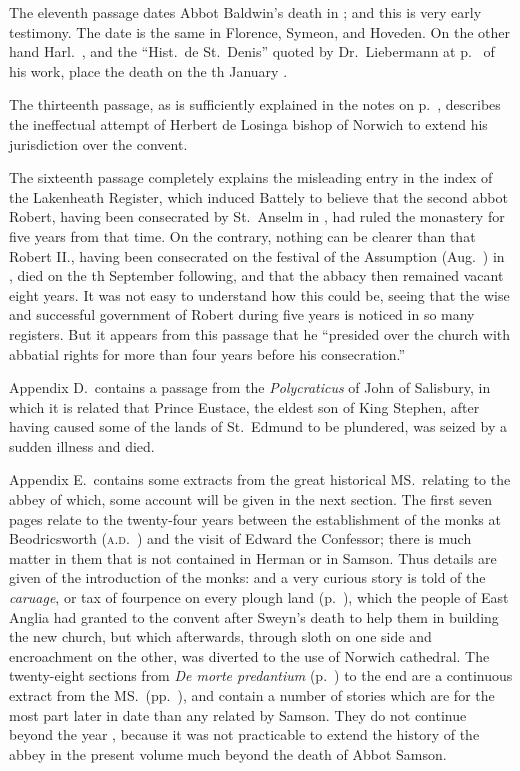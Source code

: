 \documentclass[10pt]{book}
\begin{document}
{The eleventh passage dates Abbot Baldwin's death in ; and this is very early testimony. The date is the same in Florence, Symeon, and Hoveden. On the other hand Harl.\ , and the ``Hist.\ de St.\ Denis'' quoted by Dr.\ Liebermann at p.\  of his work, place the death on the th January .

The thirteenth passage, as is sufficiently explained in the notes on p.\ , describes the ineffectual attempt of Herbert de Losinga bishop of Norwich to extend his jurisdiction over the convent.

The sixteenth passage completely explains the misleading entry in the index of the Lakenheath Register, which induced Battely to believe that the second abbot Robert, having been consecrated by St.\ Anselm in , had ruled the monastery for five years from that time. On the contrary, nothing can be clearer than that Robert II., having been consecrated on the festival of the Assumption (Aug.\ ) in , died on the th September following, and that the abbacy then remained vacant eight years. It was not easy to understand how this could be, seeing that the wise and successful government of Robert during five years is noticed in so many registers. But it appears from this passage that he ``presided over the church with abbatial rights for more than four years before his consecration.''

Appendix D.\ contains a passage from the \emph{Polycraticus} of John of Salisbury, in which it is related that Prince Eustace, the eldest son of King Stephen, after having caused some of the lands of St.\ Edmund to be plundered, was seized by a sudden illness and died.

Appendix E.\ contains some extracts from the great historical MS.\ relating to the abbey of which, some account will be given in the next section. The first seven pages relate to the twenty-four years between the establishment of the monks at Beodricsworth (\textsc{a.d}.\ ) and the visit of Edward the Confessor; there is much matter in them that is not contained in Herman or in Samson. Thus details are given of the introduction of the monks: and a very curious story is told of the \emph{caruage}, or tax of fourpence on every plough land (p.\ ), which the people of East Anglia had granted to the convent after Sweyn's death to help them in building the new church, but which afterwards, through sloth on one side and encroachment on the other, was diverted to the use of Norwich cathedral. The twenty-eight sections from \emph{De morte predantium} (p.\ ) to the end are a continuous extract from the MS.\ (pp.\ ), and contain a number of stories which are for the most part later in date than any related by Samson. They do not continue beyond the year , because it was not practicable to extend the history of the abbey in the present volume much beyond the death of Abbot Samson.


}
\end{document}
